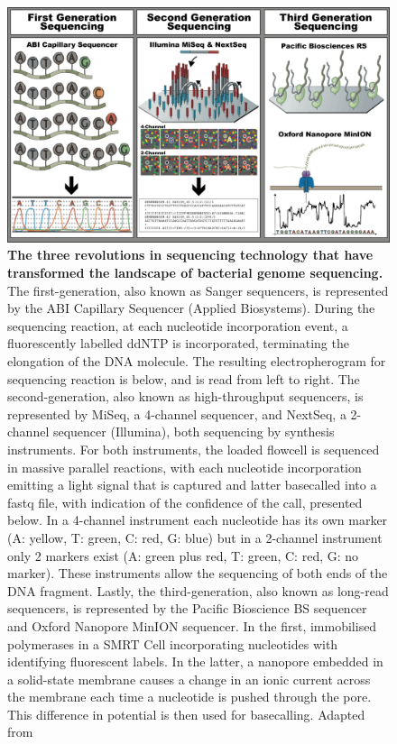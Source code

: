 \begin{figure}[h!]
\centering
\includegraphics[width=\textwidth]{figures/introduction/Figure 5.png}
\caption{\textbf{The three revolutions in sequencing technology that have transformed the landscape of bacterial genome sequencing.} The first-generation, also known as Sanger sequencers, is represented by the ABI Capillary Sequencer (Applied Biosystems). During the sequencing reaction, at each nucleotide incorporation event, a fluorescently labelled \ac{ddNTP} is incorporated, terminating the elongation of the \ac{DNA} molecule. The resulting electropherogram for sequencing reaction is below, and is read from left to right. The second-generation, also known as high-throughput sequencers, is represented by MiSeq, a 4-channel sequencer, and NextSeq, a 2-channel sequencer (Illumina), both sequencing by synthesis instruments. For both instruments, the loaded flowcell is sequenced in massive parallel reactions, with each nucleotide incorporation emitting a light signal that is captured and latter basecalled into a fastq file, with indication of the confidence of the call, presented below. In a 4-channel instrument each nucleotide has its own marker (A: yellow, T: green, C: red, G: blue) but in a 2-channel instrument only 2 markers exist (A: green plus red, T: green, C: red, G: no marker). These instruments allow the sequencing of both ends of the \ac{DNA} fragment. Lastly, the third-generation, also known as long-read sequencers, is represented by the Pacific Bioscience BS sequencer and Oxford Nanopore MinION sequencer. In the first, immobilised polymerases in a \ac{SMRT} Cell incorporating nucleotides with identifying fluorescent labels. In the latter, a nanopore embedded in a solid-state membrane causes a change in an ionic current across the membrane each time a nucleotide is pushed through the pore. This difference in potential is then used for basecalling. Adapted from \cite{hagemann_overview_2015, loman_twenty_2015,goodwin_coming_2016, wang_nanopore_2021, metzker_sequencing_2010, xu_recent_2020}}
\label{fig:figure5}
\end{figure}

